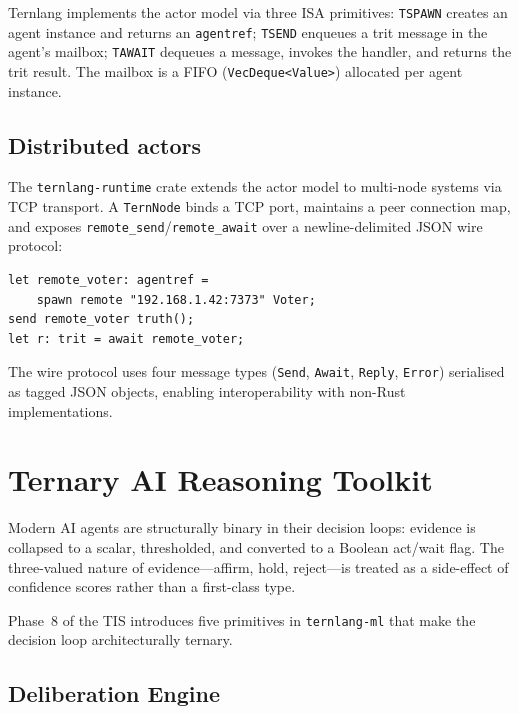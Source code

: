 \documentclass[journal,10pt,twocolumn]{IEEEtran}
\begin{document}
Ternlang implements the actor model via three ISA primitives:
\texttt{TSPAWN} creates an agent instance and returns an \texttt{agentref};
\texttt{TSEND} enqueues a trit message in the agent's mailbox; \texttt{TAWAIT}
dequeues a message, invokes the handler, and returns the trit result. The
mailbox is a FIFO (\texttt{VecDeque<Value>}) allocated per agent instance.

\subsection{Distributed actors}

The \texttt{ternlang-runtime} crate extends the actor model to multi-node
systems via TCP transport. A \texttt{TernNode} binds a TCP port, maintains a
peer connection map, and exposes \texttt{remote\_send}/\texttt{remote\_await}
over a newline-delimited JSON wire protocol:

\begin{lstlisting}[language=ternlang,
  caption={Remote actor spawn in ternlang}]
let remote_voter: agentref =
    spawn remote "192.168.1.42:7373" Voter;
send remote_voter truth();
let r: trit = await remote_voter;
\end{lstlisting}

The wire protocol uses four message types (\texttt{Send}, \texttt{Await},
\texttt{Reply}, \texttt{Error}) serialised as tagged JSON objects, enabling
interoperability with non-Rust implementations.

\section{Ternary AI Reasoning Toolkit}
\label{sec:reasoning}

Modern AI agents are structurally binary in their decision loops: evidence
is collapsed to a scalar, thresholded, and converted to a Boolean act/wait
flag. The three-valued nature of evidence—affirm, hold, reject—is treated
as a side-effect of confidence scores rather than a first-class type.

Phase~8 of the TIS introduces five primitives in \texttt{ternlang-ml} that
make the decision loop architecturally ternary.

\subsection{Deliberation Engine}
\end{document}
